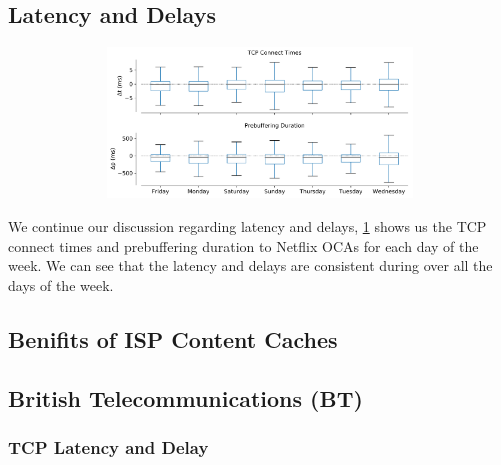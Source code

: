 \subsection{Latency and Delays}
\begin{figure}[!ht]
	\centering
	\includegraphics[keepaspectratio, height=4cm, width=15cm]{figures/tcp/netflix-connect-time-pd-boxplot-day.pdf}
	\caption[TCP Connect Times and Prebuffering Duration Boxplot for each Day of the Week]{}
	\label{fig:TCP Connect Times and Prebuffering Duration Boxplot for each Day of the Week}
\end{figure}

We continue our discussion regarding latency and delays, \cref{fig:TCP Connect Times and Prebuffering Duration Boxplot for each Day of the Week} shows us the TCP connect times and prebuffering duration to Netflix OCAs for each day of the week. We can see that the latency and delays are consistent during over all the days of the week.  

\FloatBarrier

\subsection{Benifits of ISP Content Caches}

\subsection*{British Telecommunications (BT) }

\subsubsection*{TCP Latency and Delay}

